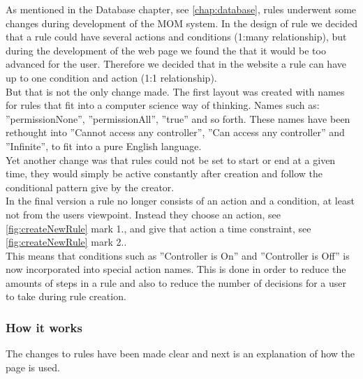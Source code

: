 As mentioned in the Database chapter, see \vref{chap:database}, rules underwent some changes during development of the MOM system. In the design of rule we decided that a rule could have several actions and conditions (1:many relationship), but during the development of the web page we found the that it would be too advanced for the user. Therefore we decided that in the website a rule can have up to one condition and action (1:1 relationship).\\ 
But that is not the only change made. The first layout was created with names for rules that fit into a computer science way of thinking. Names such as: ''permissionNone'', ''permissionAll'', ''true'' and so forth. These names have been rethought into ''Cannot access any controller'', ''Can access any controller'' and ''Infinite'', to fit into a pure English language.\\
Yet another change was that rules could not be set to start or end at a given time, they would simply be active constantly after creation and follow the conditional pattern give by the creator.\\
In the final version a rule no longer consists of an action and a condition, at least not from the users viewpoint. Instead they choose an action, see \ref{fig:createNewRule} mark 1., and give that action a time constraint, see \ref{fig:createNewRule} mark 2..\\
This means that conditions such as ''Controller is On'' and ''Controller is Off'' is now incorporated into special action names.
This is done in order to reduce the amounts of steps in a rule and also to reduce the number of decisions for a user to take during rule creation.

\subsubsection{How it works}
The changes to rules have been made clear and next is an explanation of how the page is used.\\

